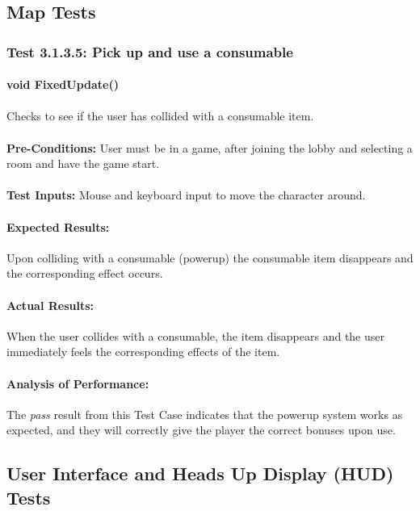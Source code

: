 \documentclass{article}
\begin{document}
    \subsection{Map Tests}
    \subsubsection{Test 3.1.3.5: Pick up and use a consumable}
    \paragraph{}\textbf{void FixedUpdate()}
    \paragraph{} Checks to see if the user has collided with a consumable item.
    \paragraph{}\textbf{Pre-Conditions:} User must be in a game, after joining the lobby and selecting a room and have the game start.
    \paragraph{}\textbf{Test Inputs:} Mouse and keyboard input to move the character around.
    \paragraph{Expected Results:} Upon colliding with a consumable (powerup) the consumable item disappears and the corresponding effect occurs.
    \paragraph{Actual Results:} When the user collides with a consumable, the item disappears and the user immediately feels the corresponding effects of the item.
    \paragraph{Analysis of Performance:} The \emph{pass} result from this Test Case indicates that the powerup system works as expected, and they will correctly give the player the correct bonuses upon use.
    
    \subsection{User Interface and Heads Up Display (HUD) Tests}
\end{document}
